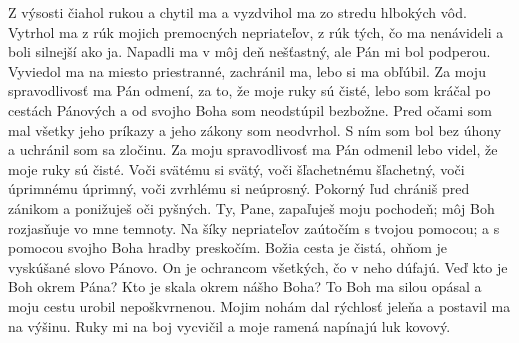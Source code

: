 Z výsosti čiahol rukou a chytil ma
a vyzdvihol ma zo stredu hlbokých vôd.
\versseparator
Vytrhol ma z rúk mojich premocných nepriateľov,
z rúk tých, čo ma nenávideli
a boli silnejší ako ja.
\versseparator
Napadli ma v môj deň nešťastný,
ale Pán mi bol podperou.
\versseparator
Vyviedol ma na miesto priestranné,
zachránil ma, lebo si ma obľúbil.
\versseparator
Za moju spravodlivosť ma Pán odmení,
za to, že moje ruky sú čisté,
\versseparator
lebo som kráčal po cestách Pánových
a od svojho Boha som neodstúpil bezbožne.
\versseparator
Pred očami som mal všetky jeho príkazy
a jeho zákony som neodvrhol.
\versseparator
S ním som bol bez úhony
a uchránil som sa zločinu.
\versseparator
Za moju spravodlivosť ma Pán odmenil
lebo videl, že moje ruky sú čisté.
\versseparator
Voči svätému si svätý,
voči šľachetnému šľachetný,
\versseparator
voči úprimnému úprimný,
voči zvrhlému si neúprosný.
\versseparator
Pokorný ľud chrániš pred zánikom
a ponižuješ oči pyšných.
\versseparator
Ty, Pane, zapaľuješ moju pochodeň;
môj Boh rozjasňuje vo mne temnoty.
\versseparator
Na šíky nepriateľov zaútočím s tvojou pomocou;
a s pomocou svojho Boha hradby preskočím.
\versseparator
Božia cesta je čistá,
ohňom je vyskúšané slovo Pánovo.
On je ochrancom všetkých, čo v neho dúfajú.
\versseparator
Veď kto je Boh okrem Pána?
Kto je skala okrem nášho Boha?
\versseparator
To Boh ma silou opásal
a moju cestu urobil nepoškvrnenou.
\versseparator
Mojim nohám dal rýchlosť jeleňa
a postavil ma na výšinu.
\versseparator
Ruky mi na boj vycvičil
a moje ramená napínajú luk kovový.
